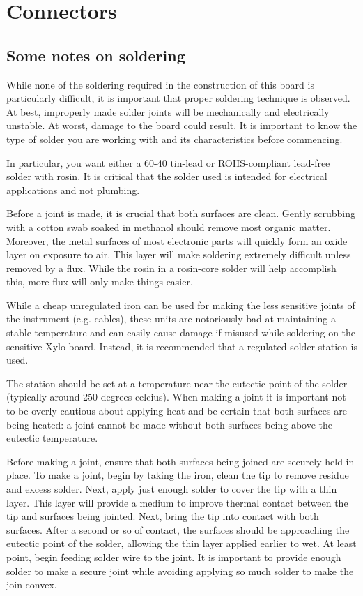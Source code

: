 \section{Connectors}

\subsection{Some notes on soldering}

While none of the soldering required in the construction of this board
is particularly difficult, it is important that proper soldering
technique is observed. At best, improperly made solder joints will be
mechanically and electrically unstable. At worst, damage to the board
could result. It is important to know the type of solder you are
working with and its characteristics before commencing.

In particular, you want either a 60-40 tin-lead or ROHS-compliant
lead-free solder with rosin. It is critical that the 
solder used is intended for electrical applications and not plumbing.

Before a joint is made, it is crucial that both surfaces are
clean. Gently scrubbing with a cotton swab soaked in methanol should
remove most organic matter. Moreover, the metal surfaces of most
electronic parts will quickly form an oxide layer on exposure to
air. This layer will make soldering extremely difficult unless removed
by a flux. While the rosin in a rosin-core solder will help accomplish
this, more flux will only make things easier.

While a cheap unregulated iron can be used for making the less
sensitive joints of the instrument (e.g. cables), these units are
notoriously bad at maintaining a stable temperature and can easily
cause damage if misused while soldering on the sensitive Xylo
board. Instead, it is recommended that a regulated solder station is
used.

The station should be set at a temperature near the eutectic point of
the solder (typically around 250 degrees celcius). When making a
joint it is important not to be overly cautious about applying heat
and be certain that both surfaces are being heated: a joint cannot be
made without both surfaces being above the eutectic temperature.

Before making a joint, ensure that both surfaces being joined are
securely held in place.  To make a joint, begin by taking the iron,
clean the tip to remove residue and excess solder. Next, apply just
enough solder to cover the tip with a thin layer. This layer will
provide a medium to improve thermal contact between the tip and
surfaces being jointed. Next, bring the tip into contact with both
surfaces. After a second or so of contact, the surfaces should be
approaching the eutectic point of the solder, allowing the thin layer
applied earlier to wet. At least point, begin feeding solder wire to
the joint. It is important to provide enough solder to make a secure
joint while avoiding applying so much solder to make the join convex.

